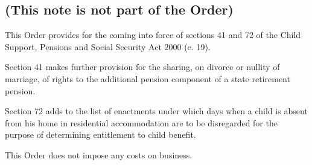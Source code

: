 \documentclass[12pt,a4paper]{article}
\begin{document}
\renewcommand\parthead{--- Explanatory Note}

\subsection*{(This note is not part of the Order)}

This Order provides for the coming into force of sections 41 and 72 of the Child Support, Pensions and Social Security Act 2000 (c. 19).

Section 41 makes further provision for the sharing, on divorce or nullity of marriage, of rights to the additional pension component of a state retirement pension.

Section 72 adds to the list of enactments under which days when a child is absent from his home in residential accommodation are to be disregarded for the purpose of determining entitlement to child benefit.

This Order does not impose any costs on business. 
\end{document}
